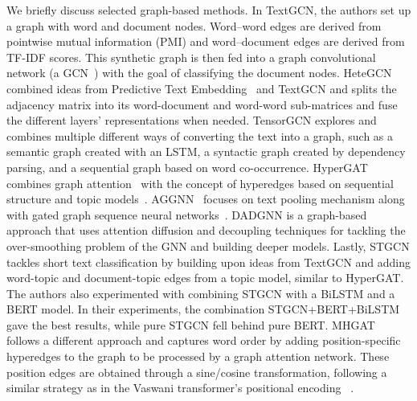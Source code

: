 We briefly discuss selected graph-based methods.
In TextGCN, the authors set up a graph with word and document nodes. Word--word edges are derived from pointwise mutual information (PMI) and word--document edges are derived from TF-IDF scores.
This synthetic graph is then fed into a graph convolutional network (\eg a GCN~\cite{DBLP:conf/iclr/KipfW17}) with the goal of classifying the document nodes.
HeteGCN combined ideas from Predictive Text Embedding~\cite{DBLP:conf/kdd/TangQM15} and TextGCN and splits the adjacency matrix into its word-document and word-word sub-matrices and fuse the different layers' representations when needed.
TensorGCN explores and combines multiple different ways of converting the text into a graph, such as a semantic graph created with an LSTM, a syntactic graph created by dependency parsing, and a sequential graph based on word co-occurrence. 
HyperGAT combines graph attention~\cite{velickovic2018graph} with the concept of hyperedges based on sequential structure and topic models~\cite{DBLP:journals/jmlr/BleiNJ03}.
AGGNN~\cite{aggnn} focuses on text pooling mechanism along with gated graph sequence neural networks~\cite{DBLP:journals/corr/LiTBZ15}.
DADGNN is a graph-based approach that uses attention diffusion and decoupling techniques for tackling the over-smoothing problem of the GNN and building deeper models. 
Lastly, STGCN tackles short text classification by building upon ideas from TextGCN and adding word-topic and document-topic edges from a topic model, similar to HyperGAT.
The authors also experimented with combining STGCN with a BiLSTM and a BERT model.
In their experiments, the combination STGCN+BERT+BiLSTM gave the best results, while pure STGCN fell behind pure BERT. MHGAT~\cite{mhgat} follows a different approach and captures word order by adding position-specific hyperedges to the graph to be processed by a graph attention network. These position edges are obtained through a sine/cosine transformation, following a similar strategy as in the Vaswani transformer's positional encoding ~\cite{DBLP:conf/nips/VaswaniSPUJGKP17}.

